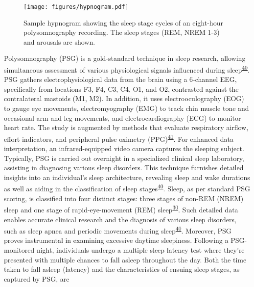 \documentclass[
  10pt,
]{scrbook}
\begin{document}
\begin{figure}

{\centering \texttt{[image: figures/hypnogram.pdf]}

}

\caption{\label{fig-hypno}Sample hypnogram showing the sleep stage
cycles of an eight-hour polysomnography recording. The sleep stages
(REM, NREM 1-3) and arousals are shown.}

\end{figure}

Polysomnography (PSG) is a gold-standard technique in sleep research,
allowing simultaneous assessment of various physiological signals
influenced during
sleep\textsuperscript{\protect\hyperlink{ref-sadeh_2015}{40}}. PSG
gathers electrophysiological data from the brain using a 6-channel EEG,
specifically from locations F3, F4, C3, C4, O1, and O2, contrasted
against the contralateral mastoids (M1, M2). In addition, it uses
electrooculography (EOG) to gauge eye movements, electromyography (EMG)
to track chin muscle tone and occasional arm and leg movements, and
electrocardiography (ECG) to monitor heart rate. The study is augmented
by methods that evaluate respiratory airflow, effort indicators, and
peripheral pulse oximetry
(PPG)\textsuperscript{\protect\hyperlink{ref-ibuxe1uxf1ez_2018}{41}}.
For enhanced data interpretation, an infrared-equipped video camera
captures the sleeping subject. Typically, PSG is carried out overnight
in a specialized clinical sleep laboratory, assisting in diagnosing
various sleep disorders. This technique furnishes detailed insights into
an individual's sleep architecture, revealing sleep and wake durations
as well as aiding in the classification of sleep
stages\textsuperscript{\protect\hyperlink{ref-sadeh_2015}{40}}. Sleep,
as per standard PSG scoring, is classified into four distinct stages:
three stages of non-REM (NREM) sleep and one stage of rapid-eye-movement
(REM) sleep\textsuperscript{\protect\hyperlink{ref-roebuck_2014}{30}}.
Such detailed data enables accurate clinical research and the diagnosis
of various sleep disorders, such as sleep apnea and periodic movements
during sleep\textsuperscript{\protect\hyperlink{ref-sadeh_2015}{40}}.
Moreover, PSG proves instrumental in examining excessive daytime
sleepiness. Following a PSG-monitored night, individuals undergo a
multiple sleep latency test where they're presented with multiple
chances to fall asleep throughout the day. Both the time taken to fall
asleep (latency) and the characteristics of ensuing sleep stages, as
captured by PSG, are
\end{document}
